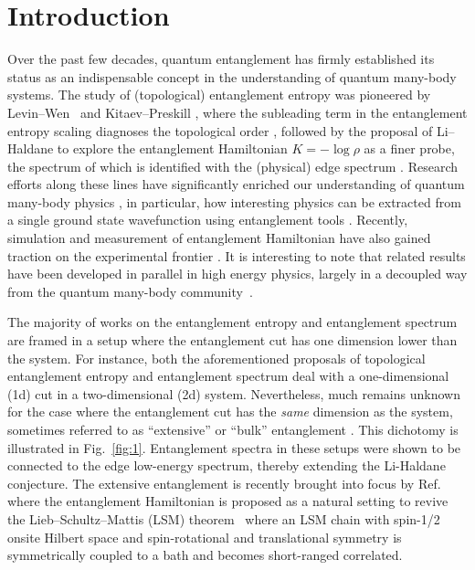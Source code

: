 \documentclass[twocolumn,aps,prb,english]{revtex4-2}
\begin{document}
\section{Introduction}
Over the past few decades, quantum entanglement has firmly established its status as an indispensable concept in the understanding of quantum many-body systems. The study of (topological) entanglement entropy was pioneered by Levin--Wen~\cite{Levin2006} and Kitaev--Preskill \cite{Kitaev2006}, where the subleading term in the entanglement entropy scaling diagnoses the topological order \cite{Jiang2012}, followed by the proposal of Li--Haldane \cite{Li2008} to explore the entanglement Hamiltonian $K=-\log \rho$ as a finer probe, the spectrum of which is identified with the (physical) edge spectrum \cite{Fidkowski2010,Pollmann2010,Qi2012}. Research efforts along these lines have significantly enriched our understanding of quantum many-body physics \cite{Zeng2019}, in particular, how interesting physics can be extracted from a single ground state wavefunction using entanglement tools \cite{Amico2008,Jiang2012,Zhang2012,Cincio2013,Kim2022a,Kim2022b,Zou2022,Fan2022,Fan2023,Liu2023}. Recently, simulation and measurement of entanglement Hamiltonian have also gained traction on the experimental frontier \cite{Dalmonte2018,Choo2018,Zache2022,Dalmonte2022}. It is interesting to note that related results have been developed in parallel in high energy physics, largely in a decoupled way from the quantum many-body community~\cite{Bisognano1975,Bisognano1976,Witten2018,Dalmonte2022}.

The majority of works on the entanglement entropy and entanglement spectrum are framed in a setup where the entanglement cut has one dimension lower than the system. For instance, both the aforementioned proposals of topological entanglement entropy and entanglement spectrum deal with a one-dimensional (1d) cut in a two-dimensional (2d) system. Nevertheless, much remains unknown for the case where the entanglement cut has the \emph{same} dimension as the system, sometimes referred to as ``extensive'' or ``bulk'' entanglement \cite{Poilblanc2010, schliemann2012entanglement,rao2014criticalentanglement,Hsieh2014,Vijay2015,Santos2015,gu2016holographic,nehra2018manybody,Zhu2019,Li2023}. This dichotomy is illustrated in Fig.~\ref{fig:1}. Entanglement spectra in these setups were shown to be connected to the edge low-energy spectrum, thereby extending the Li-Haldane conjecture\cite{Poilblanc2010, schliemann2012entanglement}. The extensive entanglement is recently brought into focus by Ref.~\cite{zhou2023} where the entanglement Hamiltonian is proposed as a natural setting to revive the Lieb--Schultz--Mattis (LSM) theorem~\cite{Lieb1961,Oshikawa2000,Hastings2004} where an LSM chain with spin-1/2 onsite Hilbert space and spin-rotational and translational symmetry is symmetrically coupled to a bath and becomes short-ranged correlated. 
\end{document}
